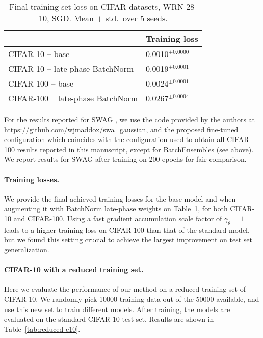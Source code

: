 \documentclass{article} \usepackage{iclr2021_conference,times}
\begin{document}
\begin{table}
\centering
\caption{Final training set loss on CIFAR datasets, WRN 28-10, SGD.  Mean $\pm$ std.~over 5 seeds.\label{tab:training-loss}}
\begin{tabular}{ll}
\toprule
    & Training loss \\\midrule
CIFAR-10 -- base &  0.0010$^{\pm 0.0000}$     \\
CIFAR-10 -- late-phase BatchNorm  & 0.0019$^{\pm 0.0001}$  \\\midrule  
CIFAR-100 -- base &  0.0024$^{\pm 0.0001}$     \\
CIFAR-100 -- late-phase BatchNorm  & 0.0267$^{\pm 0.0004}$  \\\bottomrule  
\end{tabular}
\end{table}

For the results reported for SWAG \citep{maddox_simple_2019}, we use the code provided by the authors at \url{https://github.com/wjmaddox/swa_gaussian}, and the proposed fine-tuned configuration which coincides with the configuration used to
obtain all CIFAR-100 results reported in this manuscript, except for BatchEnsembles (see above). We report results for SWAG after training on 200 epochs for fair comparison.

\paragraph{Training losses.} We provide the final achieved training losses for the base model and when augmenting it with BatchNorm late-phase weights on Table~\ref{tab:training-loss}, for both CIFAR-10 and CIFAR-100. Using a fast gradient accumulation scale factor of $\gamma_\theta=1$ leads to a higher training loss on CIFAR-100 than that of the standard model, but we found this setting crucial to achieve the largest improvement on test set generalization.



\paragraph{CIFAR-10 with a reduced training set.} Here we evaluate the performance of our method on a reduced training set of CIFAR-10. We randomly pick 10000 training data out of the 50000 available, and use this new set to train different models. After training, the models are evaluated on the standard CIFAR-10 test set. Results are shown in Table~\ref{tab:reduced-c10}. 
\end{document}
